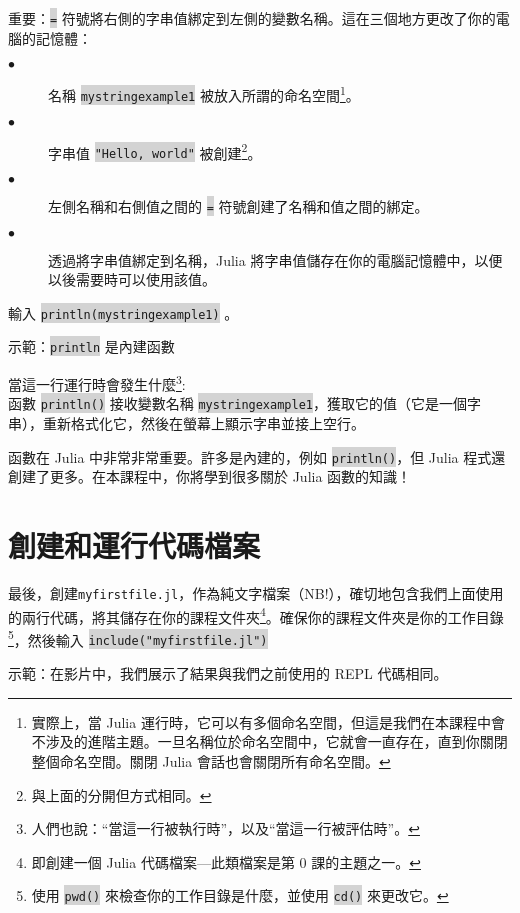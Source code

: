 \documentclass[]{article}
\newcommand{\codequote}[1]{\colorbox{lightgray}{\tt #1}}
\begin{document}
重要：\colorbox{lightgray}{\tt =} 符號將右側的字串值綁定到左側的變數名稱。這在三個地方更改了你的電腦的記憶體：
\begin{description}
	\item[$\bullet$] 名稱 \colorbox{lightgray}{\tt mystringexample1} 被放入所謂的命名空間\footnote{實際上，當 Julia 運行時，它可以有多個命名空間，但這是我們在本課程中會不涉及的進階主題。一旦名稱位於命名空間中，它就會一直存在，直到你關閉整個命名空間。關閉 Julia 會話也會關閉所有命名空間。}。
  \item[$\bullet$] 字串值 \colorbox{lightgray}{\tt "Hello, world"} 被創建\footnote{ 與上面的分開但方式相同。}。
  \item[$\bullet$] 左側名稱和右側值之間的 \colorbox{lightgray}{\tt =} 符號創建了名稱和值之間的綁定。
 \item[$\bullet$] 透過將字串值綁定到名稱，Julia 將字串值儲存在你的電腦記憶體中，以便以後需要時可以使用該值。
\end{description}

\begin{minipage}{7cm}
輸入 \colorbox{lightgray}{\tt println(mystringexample1)} 。
\end{minipage}
\hspace{4em} \begin{minipage}{7cm}
	示範：\codequote{println} 是內建函數
\end{minipage}

當這一行運行時會發生什麼\footnote{人們也說：``當這一行被執行時''，以及``當這一行被評估時''。}:\\
函數 \colorbox{lightgray}{\tt println()} 接收變數名稱 \colorbox{lightgray}{\tt mystringexample1}，獲取它的值（它是一個字串），重新格式化它，然後在螢幕上顯示字串並接上空行。

函數在 Julia 中非常非常重要。許多是內建的，例如 \colorbox{lightgray}{\tt println()}，但 Julia 程式還創建了更多。在本課程中，你將學到很多關於 Julia 函數的知識！

\section*{創建和運行代碼檔案}

\begin{minipage}[t]{10.5cm}
	最後，創建{\tt myfirstfile.jl}，作為純文字檔案（NB!），確切地包含我們上面使用的兩行代碼，將其儲存在你的課程文件夾\footnote{即創建一個 Julia 代碼檔案---此類檔案是第 0 課的主題之一。}。確保你的課程文件夾是你的工作目錄\footnote{使用 \colorbox{lightgray}{\tt pwd()} 來檢查你的工作目錄是什麼，並使用 \colorbox{lightgray}{\tt cd()} 來更改它。}，然後輸入 \colorbox{lightgray}{\tt include("myfirstfile.jl")}
	\end{minipage}
\hspace{4em} \begin{minipage}[t]{4.5cm}
示範：在影片中，我們展示了結果與我們之前使用的 REPL 代碼相同。
\end{minipage}
\end{document}
